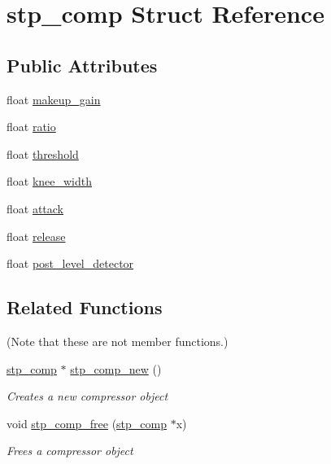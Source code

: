 \hypertarget{structstp__comp}{}\section{stp\+\_\+comp Struct Reference}
\label{structstp__comp}
\subsection*{Public Attributes}
\begin{DoxyCompactItemize}
\item 
float \mbox{\hyperlink{structstp__comp_a1b05876761b61dbd892522db342e0164}{makeup\+\_\+gain}}
\item 
float \mbox{\hyperlink{structstp__comp_af974f00e16ea96857c98da1e03da87fa}{ratio}}
\item 
float \mbox{\hyperlink{structstp__comp_a9088e7fa7f1326cd58285b1436f51a13}{threshold}}
\item 
float \mbox{\hyperlink{structstp__comp_af76f213eccad338ea25159cf33cf1836}{knee\+\_\+width}}
\item 
float \mbox{\hyperlink{structstp__comp_a8a102a4737ae2985fceb43130b74d0d6}{attack}}
\item 
float \mbox{\hyperlink{structstp__comp_a7e17e06c076d551fc4f85343b9a1804c}{release}}
\item 
float \mbox{\hyperlink{structstp__comp_a4f4614383b3dc45ef0d988670dea4cf7}{post\+\_\+level\+\_\+detector}}
\end{DoxyCompactItemize}
\subsection*{Related Functions}
(Note that these are not member functions.) \begin{DoxyCompactItemize}
\item 
\mbox{\hyperlink{structstp__comp}{stp\+\_\+comp}} $\ast$ \mbox{\hyperlink{structstp__comp_adcecb43a5505c7a62ff01747b89cba1c}{stp\+\_\+comp\+\_\+new}} ()
\begin{DoxyCompactList}\small\item\em Creates a new compressor object~\newline
 \end{DoxyCompactList}\item 
void \mbox{\hyperlink{structstp__comp_a250b6965bb5bba02f74852c81d351e6b}{stp\+\_\+comp\+\_\+free}} (\mbox{\hyperlink{structstp__comp}{stp\+\_\+comp}} $\ast$x)
\begin{DoxyCompactList}\small\item\em Frees a compressor object~\newline
 \end{DoxyCompactList}\end{DoxyCompactItemize}


